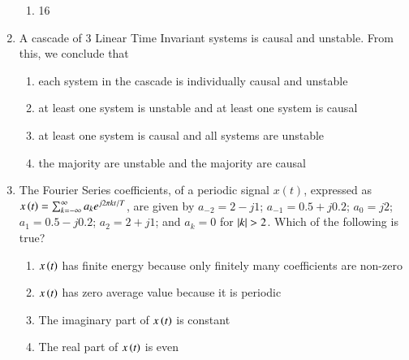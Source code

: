 \documentclass[journal]{IEEEtran}
\numberwithin{equation}{enumi}
\numberwithin{figure}{enumi}
\begin{document}
\begin{enumerate}[start=25]
\begin{enumerate}
        \item 16
    \end{enumerate}
    \item A cascade of 3 Linear Time Invariant systems is causal and unstable. From this, we conclude that
    \begin{enumerate}
        \item each system in the cascade is individually causal and unstable
        \item at least one system is unstable and at least one system is causal
        \item at least one system is causal and all systems are unstable
        \item the majority are unstable and the majority are causal
    \end{enumerate}
    \item The Fourier Series coefficients, of a periodic signal $x(t)$, expressed as $x\left(t\right) = \sum_{k=-\infty}^{\infty} a_k e^{j2\pi k t/T}$, are given by $a_{-2} = 2 - j1$; $a_{-1} = 0.5 + j0.2$; $a_0 = j2$; $a_1 = 0.5 - j0.2$; $a_2 = 2 + j1$; and $a_k = 0$ for $\left\vert k\right\vert > 2$. Which of the following is true?
    \begin{enumerate}
        \item $x\left(t\right)$ has finite energy because only finitely many coefficients are non-zero
        \item $x\left(t\right)$ has zero average value because it is periodic
        \item The imaginary part of $x\left(t\right)$ is constant
        \item The real part of $x\left(t\right)$ is even
    \end{enumerate}

\end{enumerate}
\end{document}
